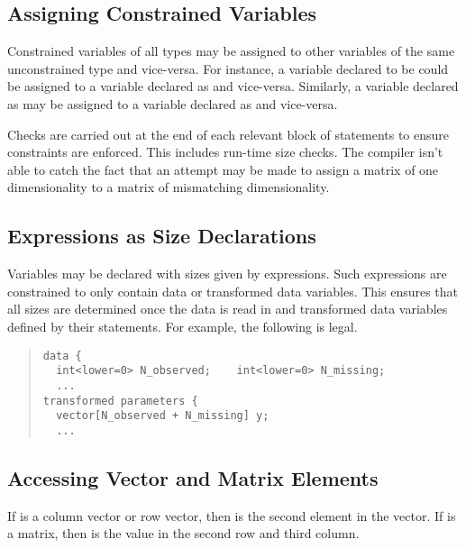 \subsection{Assigning Constrained Variables}

Constrained variables of all types may be assigned to other variables
of the same unconstrained type and vice-versa.  For instance, a
variable declared to be  could be assigned to a
variable declared as  and vice-versa.  Similarly,
a variable declared as  may be assigned to a
variable declared as  and vice-versa.  

Checks are carried out at the end of each relevant block of statements
to ensure constraints are enforced.  This includes run-time size
checks.  The \Stan compiler isn't able to catch the fact that an
attempt may be made to assign a matrix of one dimensionality to a
matrix of mismatching dimensionality.  


\subsection{Expressions as Size Declarations}

Variables may be declared with sizes given by expressions.  Such
expressions are constrained to only contain data or transformed data
variables.  This ensures that all sizes are determined once the data
is read in and transformed data variables defined by their statements.
For example, the following is legal.
%
\begin{quote}
\begin{Verbatim}
data {
  int<lower=0> N_observed;    int<lower=0> N_missing;
  ...
transformed parameters {
  vector[N_observed + N_missing] y;
  ...
\end{Verbatim}
\end{quote}

\subsection{Accessing Vector and Matrix Elements}

If  is a column vector or row vector, then  is the
second element in the vector.  If  is a matrix, then
 is the value in the second row and third column.

